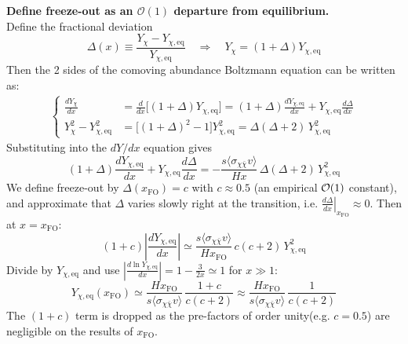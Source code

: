 \begin{foundation}
    \textbf{Define freeze-out as an $\mathcal{O}(1)$ departure from equilibrium.}\\
    Define the fractional deviation
    \[
        \Delta(x)\equiv\frac{Y_\chi-Y_{\chi,\mathrm{eq}}}{Y_{\chi,\mathrm{eq}}}
        \quad\Rightarrow\quad
        Y_\chi=(1+\Delta)Y_{\chi,\mathrm{eq}}
    \]
    Then the 2 sides of the comoving abundance Boltzmann equation can be written as:
    \begin{align*}
        \begin{cases}
            \frac{dY_\chi}{dx}
            &=\frac{d}{dx}\big[(1+\Delta)Y_{\chi,\mathrm{eq}}\big]
            =(1+\Delta)\frac{dY_{\chi,\mathrm{eq}}}{dx}+Y_{\chi,\mathrm{eq}}\frac{d\Delta}{dx}\\
            Y_\chi^2-Y_{\chi,\mathrm{eq}}^2
            &=\big[(1+\Delta)^2-1\big]Y_{\chi,\mathrm{eq}}^2
            =\Delta(\Delta+2)\,Y_{\chi,\mathrm{eq}}^2
        \end{cases}
    \end{align*}
    Substituting into the $dY/dx$ equation gives
    \[
        (1+\Delta)\frac{dY_{\chi,\mathrm{eq}}}{dx}+Y_{\chi,\mathrm{eq}}\frac{d\Delta}{dx}
        =-\frac{s\langle\sigma_{\chi\bar\chi}v\rangle}{Hx}\,\Delta(\Delta+2)\,Y_{\chi,\mathrm{eq}}^2
    \]
    We define freeze-out by $\Delta(x_{\mathrm{FO}})=c$ with $c\approx 0.5$ (an empirical ${\cal O}(1)$ constant), and approximate that $\Delta$ varies slowly right at the transition, i.e.
    \(\left.\frac{d\Delta}{dx}\right|_{x_{\mathrm{FO}}}\approx 0\). Then at $x=x_{\mathrm{FO}}$:
    \[
        (1+c)\left|\frac{dY_{\chi,\mathrm{eq}}}{dx}\right|
        \simeq \frac{s\langle\sigma_{\chi\bar\chi}v\rangle}{Hx_{\mathrm{FO}}}\,c(c+2)\,Y_{\chi,\mathrm{eq}}^2
    \]
    Divide by $Y_{\chi,\mathrm{eq}}$ and use
    \(\left|\frac{d\ln Y_{\chi,\mathrm{eq}}}{dx}\right|=1-\frac{3}{2x}\simeq 1\) for $x\gg 1$:
    \[
        Y_{\chi,\mathrm{eq}}(x_{\mathrm{FO}})
        \simeq \frac{Hx_{\mathrm{FO}}}{s\langle\sigma_{\chi\bar\chi}v\rangle}\,\frac{1+c}{c(c+2)}
        \approx \frac{Hx_{\mathrm{FO}}}{s\langle\sigma_{\chi\bar\chi}v\rangle}\,\frac{1}{c(c+2)}
    \]
    The $(1+c)$ term is dropped as the pre-factors of order unity(e.g. $c=0.5$) are negligible on the results of $x_{\mathrm{FO}}$. \\


\end{foundation}
